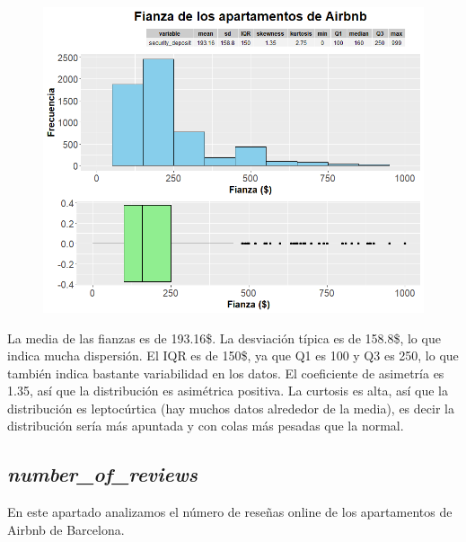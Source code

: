 \documentclass{article}
\begin{document}
\vspace{0.35cm}
\begin{figure}[h]
\hspace*{-0.15cm}
\centering
\includegraphics[scale = 0.6]{grafico_security_deposit}
\end{figure}
\vspace{0.15cm}

La media de las fianzas es de 193.16\$.
La desviación típica es de 158.8\$, lo que indica mucha dispersión.
El IQR es de 150\$, ya que Q1 es 100 y Q3 es 250, lo que también indica bastante variabilidad en los datos.
El coeficiente de asimetría es 1.35, así que la distribución es asimétrica positiva.
La curtosis es alta, así que la distribución es leptocúrtica (hay muchos datos alrededor de la media), es decir la distribución sería más apuntada y con colas más pesadas que la normal.

\clearpage
\subsection{\emph{number\_of\_reviews}}
En este apartado analizamos el número de reseñas online de los apartamentos de Airbnb de Barcelona. 
\end{document}
